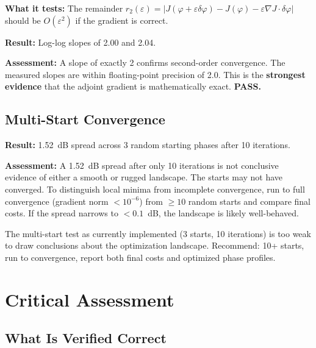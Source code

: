 \documentclass[12pt,a4paper]{article}
\theoremstyle{definition}
\begin{document}
\textbf{What it tests:} The remainder $r_2(\varepsilon) = |J(\varphi + \varepsilon\delta\varphi) - J(\varphi) - \varepsilon\nabla J \cdot \delta\varphi|$ should be $O(\varepsilon^2)$ if the gradient is correct.

\textbf{Result:} Log-log slopes of 2.00 and 2.04.

\textbf{Assessment:} A slope of exactly 2 confirms second-order convergence. The measured slopes are within floating-point precision of 2.0. This is the \textbf{strongest evidence} that the adjoint gradient is mathematically exact. \textbf{PASS.}

\subsection{Multi-Start Convergence}

\textbf{Result:} 1.52~dB spread across 3 random starting phases after 10 iterations.

\textbf{Assessment:} A 1.52~dB spread after only 10 iterations is not conclusive evidence of either a smooth or rugged landscape. The starts may not have converged. To distinguish local minima from incomplete convergence, run to full convergence (gradient norm $< 10^{-6}$) from $\geq 10$ random starts and compare final costs. If the spread narrows to $< 0.1$~dB, the landscape is likely well-behaved.

\begin{advisory}
The multi-start test as currently implemented (3 starts, 10 iterations) is too weak to draw conclusions about the optimization landscape. Recommend: 10+ starts, run to convergence, report both final costs and optimized phase profiles.
\end{advisory}


\section{Critical Assessment}
\label{sec:critical}

\subsection{What Is Verified Correct}
\end{document}
